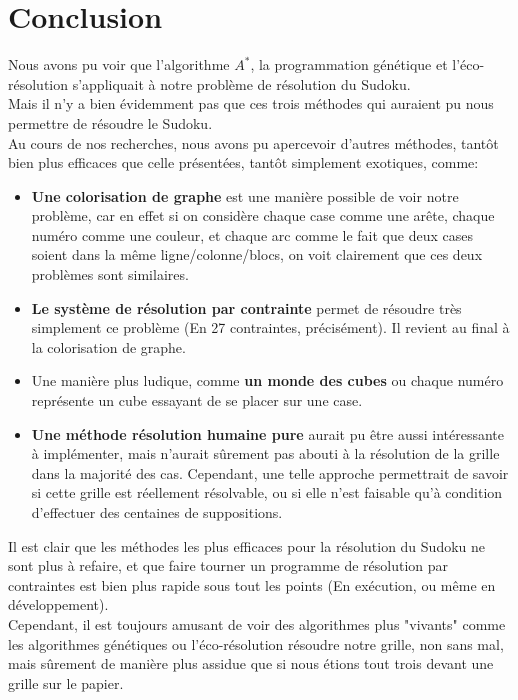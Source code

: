 \chapter{Conclusion}
    Nous avons pu voir que l'algorithme $A^{*}$, la programmation génétique et l'éco-résolution s'appliquait à notre problème de résolution du Sudoku. \\

    Mais il n'y a bien évidemment pas que ces trois méthodes qui auraient pu nous permettre de résoudre le Sudoku. \\

    Au cours de nos recherches, nous avons pu apercevoir d'autres méthodes, tantôt bien plus efficaces que celle présentées, tantôt simplement exotiques, comme:
    \begin{itemize}
        \item \textbf{Une colorisation de graphe} est une manière possible de voir notre problème, car en effet si on considère chaque case comme une arête, chaque numéro comme une couleur, et chaque arc comme le fait que deux cases soient dans la même ligne/colonne/blocs, on voit clairement que ces deux problèmes sont similaires.
        \item \textbf{Le système de résolution par contrainte} permet de résoudre très simplement ce problème (En 27 contraintes, précisément). Il revient au final à la colorisation de graphe.
        \item Une manière plus ludique, comme \textbf{un monde des cubes} ou chaque numéro représente un cube essayant de se placer sur une case.
        \item \textbf{Une méthode résolution humaine pure} aurait pu être aussi intéressante à implémenter, mais n'aurait sûrement pas abouti à la résolution de la grille dans la majorité des cas. Cependant, une telle approche permettrait de savoir si cette grille est réellement résolvable, ou si elle n'est faisable qu'à condition d'effectuer des centaines de suppositions.
    \end{itemize}

    Il est clair que les méthodes les plus efficaces pour la résolution du Sudoku ne sont plus à refaire, et que faire tourner un programme de résolution par contraintes est bien plus rapide sous tout les points (En exécution, ou même en développement).\\
    Cependant, il est toujours amusant de voir des algorithmes plus "vivants" comme les algorithmes génétiques ou l'éco-résolution résoudre notre grille, non sans mal, mais sûrement de manière plus assidue que si nous étions tout trois devant une grille sur le papier.\\

